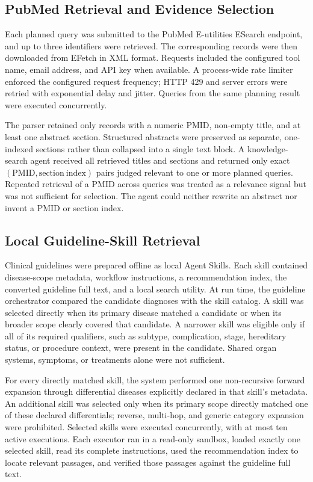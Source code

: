 \documentclass[10pt,letterpaper]{article}
\begin{document}
\subsection{PubMed Retrieval and Evidence Selection}

Each planned query was submitted to the PubMed E-utilities ESearch endpoint, and
up to three identifiers were retrieved. The corresponding records were then
downloaded from EFetch in XML format. Requests included the configured tool name,
email address, and API key when available. A process-wide rate limiter enforced
the configured request frequency; HTTP 429 and server errors were retried with
exponential delay and jitter. Queries from the same planning result were
executed concurrently.

The parser retained only records with a numeric PMID, non-empty title, and at
least one abstract section. Structured abstracts were preserved as separate,
one-indexed sections rather than collapsed into a single text block. A knowledge-
search agent received all retrieved titles and sections and returned only exact
$(\mathrm{PMID},\mathrm{section\ index})$ pairs judged relevant to one or more
planned queries. Repeated retrieval of a PMID across queries was treated as a
relevance signal but was not sufficient for selection. The agent could neither
rewrite an abstract nor invent a PMID or section index.

\subsection{Local Guideline-Skill Retrieval}

Clinical guidelines were prepared offline as local Agent Skills. Each skill
contained disease-scope metadata, workflow instructions, a recommendation index,
the converted guideline full text, and a local search utility. At run time, the
guideline orchestrator compared the candidate diagnoses with the skill catalog.
A skill was selected directly when its primary disease matched a candidate or
when its broader scope clearly covered that candidate. A narrower skill was
eligible only if all of its required qualifiers, such as subtype, complication,
stage, hereditary status, or procedure context, were present in the candidate.
Shared organ systems, symptoms, or treatments alone were not sufficient.

For every directly matched skill, the system performed one non-recursive forward
expansion through differential diseases explicitly declared in that skill's
metadata. An additional skill was selected only when its primary scope directly
matched one of these declared differentials; reverse, multi-hop, and generic
category expansion were prohibited. Selected skills were executed concurrently,
with at most ten active executions. Each executor ran in a read-only sandbox,
loaded exactly one selected skill, read its complete instructions, used the
recommendation index to locate relevant passages, and verified those passages
against the guideline full text.
\end{document}
